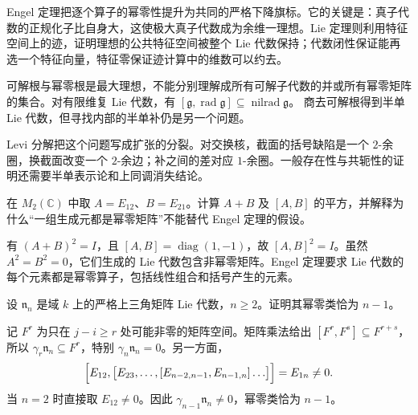 \begin{chaptersummary}
	Engel 定理把逐个算子的幂零性提升为共同的严格下降旗标。它的关键是：真子代数的正规化子比自身大，这使极大真子代数成为余维一理想。Lie 定理则利用特征空间上的迹，证明理想的公共特征空间被整个 Lie 代数保持；代数闭性保证能再选一个特征向量，特征零保证迹计算中的维数可以约去。

	\ProseParagraphBreak

	可解根与幂零根是最大理想，不能分别理解成所有可解子代数的并或所有幂零矩阵的集合。对有限维复 Lie 代数，有 \([\mathfrak g,\operatorname{rad}\mathfrak g]\subseteq\operatorname{nilrad}\mathfrak g\)。 商去可解根得到半单 Lie 代数，但寻找内部的半单补仍是另一个问题。

	\ProseParagraphBreak

	Levi 分解把这个问题写成扩张的分裂。对交换核，截面的括号缺陷是一个 \(2\)-余圈，换截面改变一个 \(2\)-余边；补之间的差对应 \(1\)-余圈。一般存在性与共轭性的证明还需要半单表示论和上同调消失结论。
\end{chaptersummary}

\BookExercises

\begin{exercise}\label{b5:ex:12-nilpotent-generators}
	在 \(M_2(\mathbb C)\) 中取 \(A=E_{12}\)、\(B=E_{21}\)。计算 \(A+B\) 及 \([A,B]\) 的平方，并解释为什么“一组生成元都是幂零矩阵”不能替代 Engel 定理的假设。
\end{exercise}
\begin{solution}
	有 \((A+B)^2=I\)，且 \([A,B]=\operatorname{diag}(1,-1)\)，故 \([A,B]^2=I\)。虽然 \(A^2=B^2=0\)，它们生成的 Lie 代数包含非幂零矩阵。Engel 定理要求 Lie 代数的每个元素都是幂零算子，包括线性组合和括号产生的元素。
\end{solution}

\begin{exercise}\label{b5:ex:12-strict-triangular-class}
	设 \(\mathfrak n_n\) 是域 \(k\) 上的严格上三角矩阵 Lie 代数，\(n\ge2\)。证明其幂零类恰为 \(n-1\)。
\end{exercise}
\begin{solution}
	记 \(F^r\) 为只在 \(j-i\ge r\) 处可能非零的矩阵空间。矩阵乘法给出 \([F^r,F^s]\subseteq F^{r+s}\)，所以 \(\gamma_r\mathfrak n_n\subseteq F^r\)，特别 \(\gamma_n\mathfrak n_n=0\)。另一方面，
	\[
		\Bigl[E_{12},\bigl[E_{23},\ldots,[E_{n-2,n-1},E_{n-1,n}]\ldots\bigr]\Bigr]=E_{1n}\ne0.
	\]
	当 \(n=2\) 时直接取 \(E_{12}\ne0\)。因此 \(\gamma_{n-1}\mathfrak n_n\ne0\)，幂零类恰为 \(n-1\)。
\end{solution}

